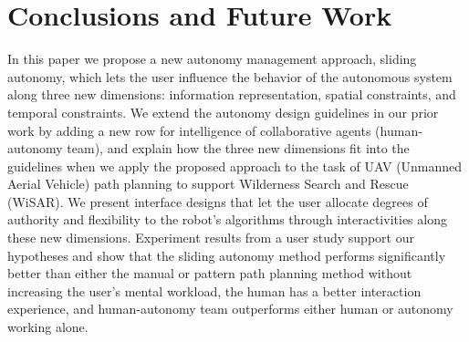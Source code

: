 \documentclass[lettersize, apacite, twoside, HRI]{apa_HRI}
\begin{document}
%

\section{Conclusions and Future Work} 
\label{sec:Conclusions6}

In this paper we propose a new autonomy management approach, sliding autonomy, which lets the user influence the behavior of the autonomous system along three new dimensions: information representation, spatial constraints, and temporal constraints. We extend the autonomy design guidelines in our prior work by adding a new row for intelligence of collaborative agents (human-autonomy team), and explain how the three new dimensions fit into the guidelines when we apply the proposed approach to the task of UAV (Unmanned Aerial Vehicle) path planning to support Wilderness Search and Rescue (WiSAR). We present interface designs that let the user allocate degrees of authority and flexibility to the robot's algorithms through interactivities along these new dimensions. Experiment results from a user study support our hypotheses and show that the sliding autonomy method performs significantly better than either the manual or pattern path planning method without increasing the user's mental workload, the human has a better interaction experience, and human-autonomy team outperforms either human or autonomy working alone.
\end{document}
